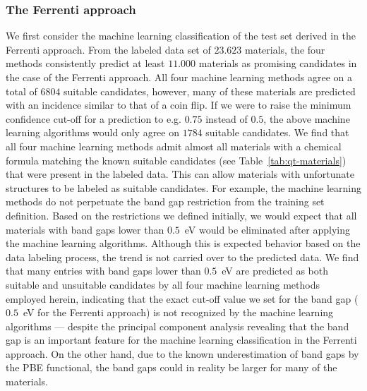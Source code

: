 \documentclass[superscriptaddress,unsortedaddress,
 amsmath,amssymb,
 aps,
]{revtex4-2}
\begin{document}
\subsubsection*{The Ferrenti approach}

We first consider the machine learning classification of the test set derived in the Ferrenti approach. 
From the labeled data set of $23.623$ materials, the four methods consistently predict at least $11.000$ materials as promising candidates in the case of the Ferrenti approach. All four machine learning methods agree on a total of $6804$ suitable candidates, however, many of these materials are predicted with an incidence similar to that of a coin flip. If we were to raise the minimum confidence cut-off for a prediction to e.g. $0.75$ instead of $0.5$, the above machine learning algorithms would only agree on $1784$ suitable candidates. 
We find that all four machine learning methods admit almost all materials with a chemical formula matching the known suitable candidates (see Table~\ref{tab:qt-materials}) that were present in the labeled data. 
This can allow materials with unfortunate structures to be labeled as suitable candidates. %
For example, the machine learning methods do not perpetuate the band gap restriction from the training set definition. 
Based on the restrictions we defined initially, we would expect that all materials with band gaps lower than $0.5$~eV would be eliminated 
after applying the machine learning algorithms.  
Although this is expected behavior based on the data labeling process, the trend is not carried over to the predicted data. We find that many entries with band gaps lower than $0.5$~eV are predicted as both suitable and unsuitable candidates by all four machine learning methods employed herein, 
indicating that the exact cut-off value we set for the band gap ($0.5$~eV for the Ferrenti approach) is not recognized by the machine learning algorithms --- despite the principal component analysis revealing that the band gap is an important feature for the machine learning classification in the Ferrenti approach.  
On the other hand, due to the known underestimation of band gaps by the PBE functional, the band gaps could in reality be larger for many of the materials. 
\end{document}
